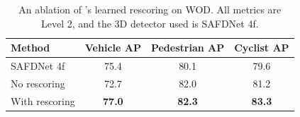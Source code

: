 \begin{table}[t]
    \centering
    \small
    \begin{tabular}{@{}lccc@{}}
        \toprule
        Method                 & Vehicle AP  & Pedestrian AP & Cyclist AP    \\ 
        \midrule
        SAFDNet 4f             & 75.4          & 80.1          & 79.6          \\
        No rescoring           & 72.7          & 82.0          & 81.2          \\
        With rescoring         & \textbf{77.0} & \textbf{82.3} & \textbf{83.3} \\ 
        \bottomrule
    \end{tabular}
    \caption{An ablation of \ourmodel{}'s learned rescoring on WOD. All metrics are Level 2, and the 3D detector used is SAFDNet 4f.}
    \label{tab:rescoring-comparison}
\end{table}